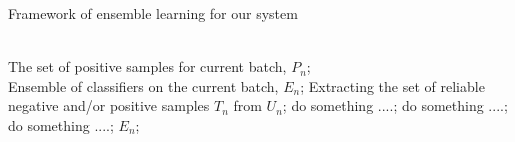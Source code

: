 \usepackage{algorithm}  
\usepackage{algorithmic}


\begin{algorithm}
\caption{Framework of ensemble learning for our system}
\label{alg:framwork}
\begin{algorithmic}[1]  %
\REQUIRE ~~\\
The set of positive samples for current batch, $P_n$;
\ENSURE ~~\\
Ensemble of classifiers on the current batch, $E_n$;
\STATE Extracting the set of reliable negative and/or positive samples $T_n$ from $U_n$;
\label{code:fram:extract} %
\STATE do something ....;
\STATE do something ....;
\STATE do something ....;
\RETURN $E_n$; %

\end{algorithmic}
\end{algorithm}
